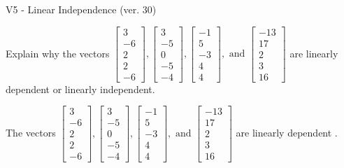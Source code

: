 \begin{exercise}
  \begin{exerciseTitle}V5 - Linear Independence (ver. 30)\end{exerciseTitle}
  \begin{exerciseStatement}
    Explain why the vectors \(\left[\begin{array}{r}
3 \\
-6 \\
2 \\
2 \\
-6
\end{array}\right] , \left[\begin{array}{r}
3 \\
-5 \\
0 \\
-5 \\
-4
\end{array}\right] , \left[\begin{array}{r}
-1 \\
5 \\
-3 \\
4 \\
4
\end{array}\right] , \text{ and } \left[\begin{array}{r}
-13 \\
17 \\
2 \\
3 \\
16
\end{array}\right]\) are linearly dependent or linearly independent.	


  \end{exerciseStatement}
  \begin{exerciseAnswer}
   The vectors \(\left[\begin{array}{r}
3 \\
-6 \\
2 \\
2 \\
-6
\end{array}\right] , \left[\begin{array}{r}
3 \\
-5 \\
0 \\
-5 \\
-4
\end{array}\right] , \left[\begin{array}{r}
-1 \\
5 \\
-3 \\
4 \\
4
\end{array}\right] , \text{ and } \left[\begin{array}{r}
-13 \\
17 \\
2 \\
3 \\
16
\end{array}\right]\) are 
  	 linearly dependent  .
  


  \end{exerciseAnswer}
\end{exercise}